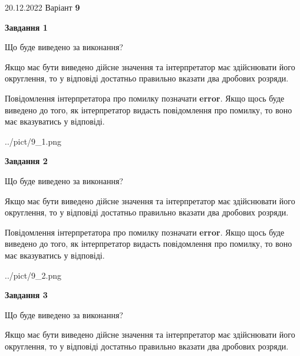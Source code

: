 \documentclass[12pt, ukrainian]{article}
\begin{document}
{20.12.2022 Варіант \No \textbf { 9 }\par}
{
\begin {Large}

{\begin {center}\textbf{Завдання 1}\end {center}}\par
Що буде виведено за виконання? \par

Якщо має бути виведено дійсне значення та інтерпретатор має здійснювати його округлення, 
то у відповіді достатньо правильно вказати два дробових розряди.

Повідомлення інтерпретатора про помилку позначати \textbf{error}.
Якщо щось буде виведено до того, як інтерпретатор видасть повідомлення про помилку, 
то воно має вказуватись у відповіді. \par

\begin{center}
	{../pict/9_1.png}
\end{center}
\newpage

{\begin {center}\textbf{Завдання 2}\end {center}}\par
Що буде виведено за виконання? \par

Якщо має бути виведено дійсне значення та інтерпретатор має здійснювати його округлення, 
то у відповіді достатньо правильно вказати два дробових розряди.

Повідомлення інтерпретатора про помилку позначати \textbf{error}.
Якщо щось буде виведено до того, як інтерпретатор видасть повідомлення про помилку, 
то воно має вказуватись у відповіді. \par

\begin{center}
	{../pict/9_2.png}
\end{center}
\newpage

{\begin {center}\textbf{Завдання 3}\end {center}}\par
Що буде виведено за виконання? \par

Якщо має бути виведено дійсне значення та інтерпретатор має здійснювати його округлення, 
то у відповіді достатньо правильно вказати два дробових розряди.


\end{Large}}
\end{document}
